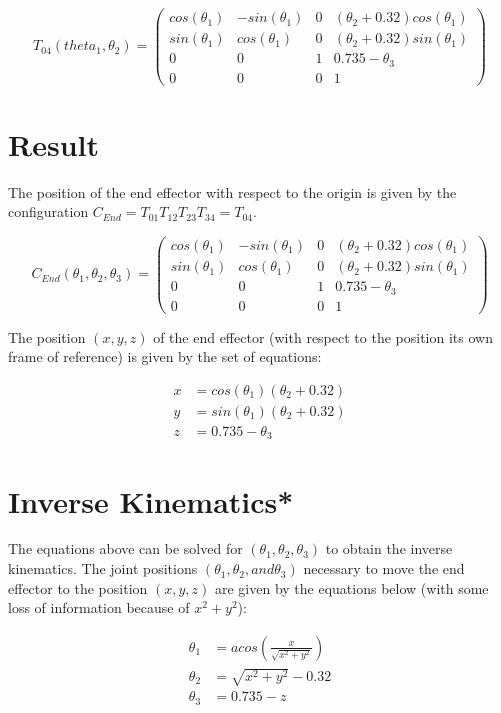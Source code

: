 \documentclass[]{scrreprt}
\begin{document}
\[
T_{04}(theta_1, \theta_2) = \left(\begin{array}{cccc}
cos(\theta_1) & -sin(\theta_1) & 0 & (\theta_2+0.32)cos(\theta_1)\\
sin(\theta_1) & cos(\theta_1) & 0 & (\theta_2+0.32)sin(\theta_1)\\
0 & 0 & 1 & 0.735-\theta_3\\
0 & 0 & 0 & 1
\end{array}\right)
\]

\section{Result}

The position of the end effector with respect to the origin is given by the configuration 
$C_{End} = T_{01}T_{12}T_{23}T_{34} = T_{04}$.

\[
C_{End}(\theta_1,\theta_2,\theta_3) = \left(\begin{array}{cccc}
cos(\theta_1) & -sin(\theta_1) & 0 & (\theta_2+0.32)cos(\theta_1)\\
sin(\theta_1) & cos(\theta_1) & 0 & (\theta_2+0.32)sin(\theta_1)\\
0 & 0 & 1 & 0.735-\theta_3\\
0 & 0 & 0 & 1
\end{array}\right)
\]

The position $(x,y,z)$ of the end effector (with respect to the position its own frame of reference) is given by the set of equations:

\begin{align}
x &= cos(\theta_1)(\theta_2+0.32)\\
y &= sin(\theta_1)(\theta_2+0.32)\\
z &= 0.735-\theta_3
\end{align}

\section{Inverse Kinematics*}

The equations above can be solved for $(\theta_1, \theta_2, \theta_3)$ to obtain the inverse kinematics.
The joint positions $(\theta_1, \theta_2, and \theta_3)$ necessary to move the end effector to the position $(x,y,z)$ are given by the equations below (with some loss of information because of $x^2+y^2$):

\begin{align}
\theta_1 &= acos\left(\frac{x}{\sqrt{x^2+y^2}}\right)\\
\theta_2 &= \sqrt{x^2+y^2}-0.32\\
\theta_3 &= 0.735-z
\end{align}
\end{document}
